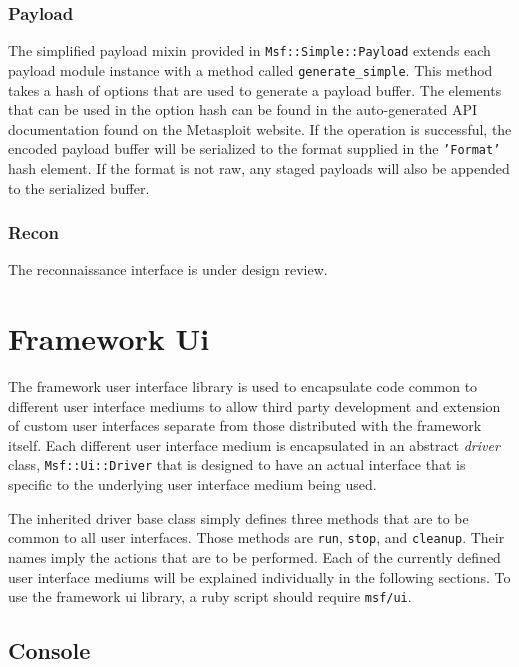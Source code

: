 \documentclass{report}
\begin{document}
        \subsection{Payload}

\par
The simplified payload mixin provided in
\texttt{Msf::Simple::Payload} extends each payload module instance
with a method called \texttt{generate\_simple}.  This method takes a
hash of options that are used to generate a payload buffer.  The
elements that can be used in the option hash can be found in the
auto-generated API documentation found on the Metasploit website. If
the operation is successful, the encoded payload buffer will be
serialized to the format supplied in the \texttt{'Format'} hash
element.  If the format is not raw, any staged payloads will also be
appended to the serialized buffer.

        \subsection{Recon}

\par
The reconnaissance interface is under design review.

\chapter{Framework Ui}

\par
The framework user interface library is used to encapsulate code
common to different user interface mediums to allow third party
development and extension of custom user interfaces separate from
those distributed with the framework itself.  Each different user
interface medium is encapsulated in an abstract \textit{driver}
class, \texttt{Msf::Ui::Driver} that is designed to have an actual
interface that is specific to the underlying user interface medium
being used.

\par
The inherited driver base class simply defines three methods that
are to be common to all user interfaces.  Those methods are
\texttt{run}, \texttt{stop}, and \texttt{cleanup}.  Their names
imply the actions that are to be performed.  Each of the currently
defined user interface mediums will be explained individually in the
following sections.  To use the framework ui library, a ruby script
should require \texttt{msf/ui}.

    \section{Console}
\end{document}
